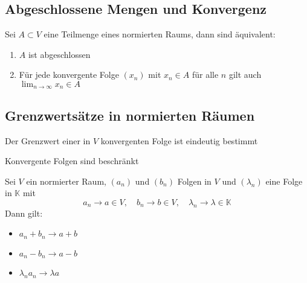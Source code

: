 	\subsection{Abgeschlossene Mengen und Konvergenz}
		\begin{Satz} [ ]
			Sei $A\subset V$ eine Teilmenge eines normierten Raums, dann sind äquivalent:
			\begin{enumerate}
				\item $A$ ist abgeschlossen
				\item Für jede konvergente Folge $(x_n)$ mit $x_n \in A$ für alle $n$ gilt auch $\lim_{n\to\infty}x_n \in A$
			\end{enumerate}
		\end{Satz}
	\subsection{Grenzwertsätze in normierten Räumen}
		\begin{Satz} [ ]
			Der Grenzwert einer in $V$ konvergenten Folge ist eindeutig bestimmt
		\end{Satz}
		\begin{Satz} [ ]
			Konvergente Folgen sind beschränkt
		\end{Satz}
		\begin{Satz} [ ]
			Sei $V$ ein normierter Raum, $(a_n)$ und $(b_n)$ Folgen in $V$ und $(\lambda_n)$ eine Folge in $\mathbb{K}$ mit 
			$$
				a_n\to a\in V, \quad b_n\to b \in V, \quad \lambda_n \to \lambda \in \mathbb{K}
			$$ 
			Dann gilt:
			\begin{itemize}
				\item $a_n + b_n \to a + b$
				\item $a_n - b_n \to a - b$
				\item $\lambda_n a_n \to \lambda a$
			\end{itemize}

		\end{Satz}
		
		
		
		